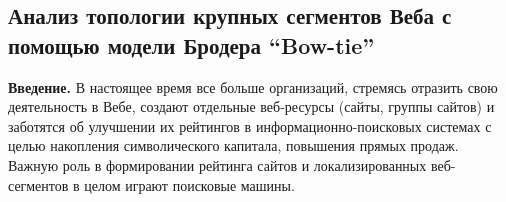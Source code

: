 %
%
%
%
%
%
%
%
%

\subsection{Анализ топологии крупных сегментов Веба с помощью модели Бродера “Bow-tie”}\label{subsec:ch1/sec2/sub1}

\textbf{Введение.} В настоящее время все больше организаций, стремясь отразить свою деятельность в Вебе, создают отдельные веб-ресурсы (сайты, группы сайтов) и заботятся об улучшении их рейтингов в информационно-поисковых системах с целью накопления символического капитала, повышения прямых продаж. Важную роль в формировании рейтинга сайтов и локализированных веб-сегментов в целом играют поисковые машины.


